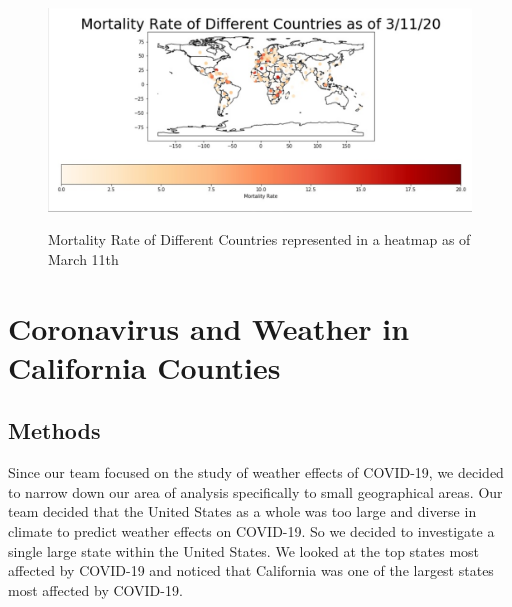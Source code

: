 \documentclass[10pt,journal,compsoc]{IEEEtran}
\begin{document}
{{\begin{figure}[!htbp] %
	\includegraphics[scale=0.19]{mortality-mar-11.png}\\
	\centering
	\caption {Mortality Rate of Different Countries represented in a heatmap as of March 11th}
	\label{LP-COVID-Mortality Rate March 11th}
\end{figure}

\section{Coronavirus and Weather in California Counties}\label{sec:coronavirus and weather in california counties}

\subsection{Methods}
\label{subsec:methods}

	Since our team focused on the study of weather effects of COVID-19, we decided to narrow down our area of analysis specifically to small geographical areas. Our team decided that the United States as a whole was too large and diverse in climate to predict weather effects on COVID-19. So we decided to investigate a single large state within the United States. We looked at the top states most affected by COVID-19 and noticed that California was one of the largest states most affected by COVID-19. 

}}
\end{document}
